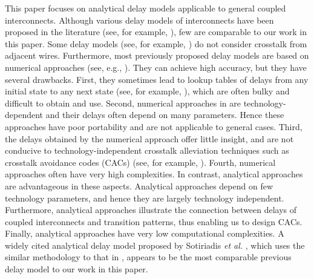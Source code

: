 \documentclass[10pt,journal]{IEEEtran}
\begin{document}
This paper focuses on analytical delay models applicable to general coupled interconnects. Although various delay models of interconnects have been proposed in the literature (see, for example, \cite{Kay98,Pil98,Alp01,Sot01,Sot02,Liu02,Dav002,Abo02,Tu06,Mol09}), few are comparable to our work in this paper. Some delay models (see, for example, \cite{Kay98,Alp01,Liu02,Mol09,Pil98,Abo02}) do not consider crosstalk from adjacent wires. Furthermore, most previously proposed delay models are based on numerical approaches (see, e.g., \cite{Kay98,Alp01,Liu02,Dav002,Tu06,Mol09,Pil98,Abo02}). They can achieve high accuracy, but they have several drawbacks. First, they sometimes lead to lookup tables of delays from any initial state to any next state (see, for example, \cite{Mol09}), which are often bulky and difficult to obtain and use. Second, numerical approaches in \cite{Kay98,Pil98,Alp01,Liu02,Abo02} are technology-dependent and their delays often depend on many parameters. Hence these approaches have poor portability and are not applicable to general cases. Third, the delays obtained by the numerical approach offer little insight, and are not conducive to technology-independent crosstalk alleviation techniques such as crosstalk avoidance codes (CACs) (see, for example, \cite{Dua01,Vic01,Sri07,Wu09}). Fourth, numerical approaches often have very high complexities. In contrast, analytical approaches are advantageous in these aspects. Analytical approaches depend on few technology parameters, and hence they are largely technology independent. Furthermore, analytical approaches illustrate the connection between delays of coupled interconnects and transition patterns, thus enabling us to design CACs. Finally, analytical approaches have very low computational complexities.
A widely cited analytical delay model proposed by Sotiriadis \emph{et al.} \cite{Sot01,Sot02}, which uses the similar methodology to that in \cite{SC_TVLSI02}, appears to be the most comparable previous delay model to our work in this paper.
\end{document}
